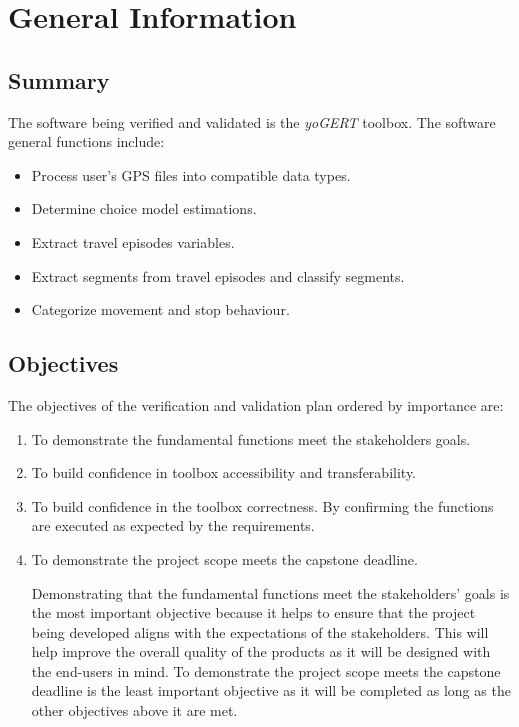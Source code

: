 \documentclass[12pt, titlepage]{article}
\begin{document}
\section{General Information}

\subsection{Summary}
The software being verified and validated is the \emph{yoGERT} toolbox. The software general functions include:
\begin{itemize}
    \item Process user's GPS files into compatible data types.
    \item Determine choice model estimations.
    \item Extract travel episodes variables.
    \item Extract segments from travel episodes and classify segments.
    \item Categorize movement and stop behaviour. 
\end{itemize}


\subsection{Objectives}
The objectives of the verification and validation plan ordered by importance are:
\begin{enumerate}
    \item To demonstrate the fundamental functions meet the stakeholders goals.
    \item To build confidence in toolbox accessibility and transferability. 
    \item To build confidence in the toolbox correctness. By confirming the functions are executed as expected by the requirements. 
    \item To demonstrate the project scope meets the capstone deadline. 


Demonstrating that the fundamental functions meet the stakeholders' goals is the most important objective because it helps to ensure that the project being developed aligns with the expectations of the stakeholders. This will help improve the overall quality of the products as it will be designed with the end-users in mind. To demonstrate the project scope meets the capstone deadline is the least important objective as it will be completed as long as the other objectives above it are met. 

\end{enumerate}
\end{document}
